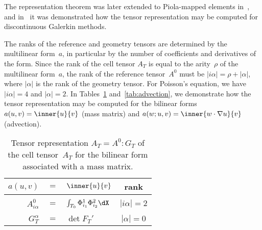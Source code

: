 The representation theorem was later extended to Piola-mapped elements
in~\citet{RognesKirbyLogg2009}, and in~\citet{OelgaardLoggWells2008}
it was demonstrated how the tensor representation may be computed for
discontinuous Galerkin methods.

The ranks of the reference and geometry tensors are determined by the
multilinear form~$a$, in particular by the number of coefficients and
derivatives of the form. Since the rank of the cell tensor $A_T$ is
equal to the arity~$\rho$ of the multilinear form~$a$, the rank of the
reference tensor~$A^0$ must be $|i\alpha| = \rho + |\alpha|$, where
$|\alpha|$ is the rank of the geometry tensor. For Poisson's equation,
we have $|i\alpha| = 4$ and $|\alpha| = 2$. In Tables~\ref{tab:mass}
and~\ref{tab:advection}, we demonstrate how the tensor representation
may be computed for the bilinear forms $a(u, v) = \inner{u}{v}$ (mass
matrix) and $a(w; u, v) = \inner{w \cdot \nabla u}{v}$ (advection).

\begin{table}
  \begin{center}
    \begin{tabular}{|rcl|c|}
      \hline
      $a(u, v)$ &$=$& $\inner{u}{v}$ & rank \\
      \hline
      \hline
      &&&\\[-2ex]
      $A^0_{i\alpha}$ &$=$& $\int_{T_0} \Phi_{i_1}^{1} \Phi_{i_2}^{2} \dX$
      & $|i\alpha| = 2$ \\[1ex]
      \hline
      &&&\\[-2ex]
      $G_T^{\alpha}$ &$=$& $\det F_T'$
      & $|\alpha| = 0$ \\[1ex]
      \hline
    \end{tabular}
    \caption{Tensor representation $A_T = A^0 : G_T$ of the cell
      tensor~$A_T$ for the bilinear form associated with a mass
      matrix.}
    \label{tab:mass}
  \end{center}
\end{table}

